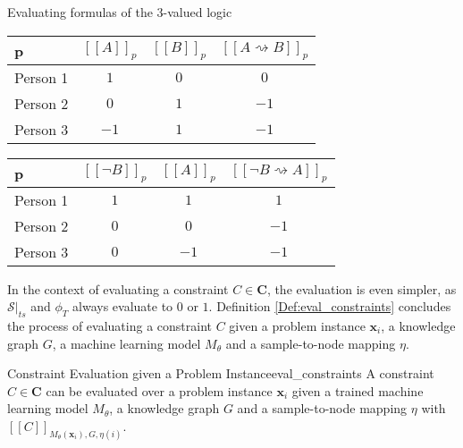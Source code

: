 \begin{Bsp}{Evaluating formulas of the 3-valued logic}{}
\captionsetup{type=htypei}
\begin{minipage}[t]{0.5\linewidth}
    \vspace{1ex}
    \centering
            \begin{tabular}{l|c|c|c}
             \toprule
             p & $[[A]]_p$ & $[[B]]_p$ & $[[A \rightsquigarrow B]]_p$ \\
             \midrule
             \midrule
             Person 1 & $1$ & $0$ & $0$ \\
             Person 2 & $0$ & $1$ & $-1$ \\
             Person 3 & $-1$ & $1$ & $-1$ \\
             \bottomrule
        \end{tabular}
    \label{tab:eval_3valuedlogic_table1}
\end{minipage}
\begin{minipage}[t]{0.5\linewidth}
    \vspace{1ex}
    \centering
            \begin{tabular}{l|c|c|c}
             \toprule
             p & $[[\neg B]]_p$ & $[[A]]_p$ & $[[\neg B \rightsquigarrow A]]_p$ \\
             \midrule
             \midrule
             Person 1 & $1$ & $1$ & $1$ \\
             Person 2 & $0$ & $0$ & $-1$ \\
             Person 3 & $0$ & $-1$ & $-1$ \\
             \bottomrule
        \end{tabular}
    \label{tab:eval_3valuedlogic_table2}
\end{minipage}
\end{Bsp}

In the context of evaluating a constraint $C \in \mathbf{C}$, the evaluation is even simpler, as $\mathcal{S}\big|_{ts}$ and $\phi_{T}$ always evaluate to $0$ or $1$. Definition \ref{Def:eval_constraints} concludes the process of evaluating a constraint $C$ given a problem instance $\mathbf{x}_i$, a knowledge graph $G$, a machine learning model $M_\theta$ and a sample-to-node mapping $\eta$.

\begin{Def}{Constraint Evaluation given a Problem Instance}{eval_constraints}
A constraint $C \in \mathbf{C}$ can be evaluated over a problem instance $\mathbf{x}_i$ given a trained machine learning model $M_\theta$, a knowledge graph $G$ and a sample-to-node mapping $\eta$ with $[[C]]_{M_\theta(\mathbf{x}_i), G, \eta(i)}$.
\end{Def}


